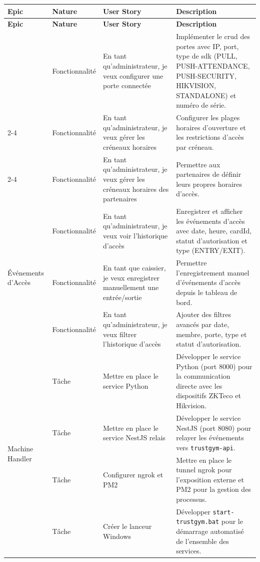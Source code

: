 ﻿\documentclass[../main.tex]{subfiles}
\begin{document}
\begin{longtable}{|p{3cm}|p{2.5cm}|p{4cm}|p{5cm}|}
\hline
\textbf{Epic} & \textbf{Nature} & \textbf{User Story} & \textbf{Description} \\
\hline
\endfirsthead
\hline
\textbf{Epic} & \textbf{Nature} & \textbf{User Story} & \textbf{Description} \\
\hline
\endhead
\hline
\endfoot

\multirow{3}{3cm}{Gestion des Portes} & Fonctionnalit\'{e} & En tant qu'administrateur, je veux configurer une porte connect\'{e}e & Impl\'{e}menter le \acrshort{crud} des portes avec IP, port, type de \acrshort{sdk} (PULL, PUSH-ATTENDANCE, PUSH-SECURITY, HIKVISION, STANDALONE) et num\'{e}ro de s\'{e}rie. \\
\cline{2-4}
& Fonctionnalit\'{e} & En tant qu'administrateur, je veux g\'{e}rer les cr\'{e}neaux horaires & Configurer les plages horaires d'ouverture et les restrictions d'acc\`{e}s par cr\'{e}neau. \\
\cline{2-4}
& Fonctionnalit\'{e} & En tant qu'administrateur, je veux g\'{e}rer les cr\'{e}neaux horaires des partenaires & Permettre aux partenaires de d\'{e}finir leurs propres horaires d'acc\`{e}s. \\
\hline

\multirow{3}{3cm}{\'{E}v\'{e}nements d'Acc\`{e}s} & Fonctionnalit\'{e} & En tant qu'administrateur, je veux voir l'historique d'acc\`{e}s & Enregistrer et afficher les \'{e}v\'{e}nements d'acc\`{e}s avec date, heure, cardId, statut d'autorisation et type (ENTRY/EXIT). \\
\cline{2-4}
& Fonctionnalit\'{e} & En tant que caissier, je veux enregistrer manuellement une entr\'{e}e/sortie & Permettre l'enregistrement manuel d'\'{e}v\'{e}nements d'acc\`{e}s depuis le tableau de bord. \\
\cline{2-4}
& Fonctionnalit\'{e} & En tant qu'administrateur, je veux filtrer l'historique d'acc\`{e}s & Ajouter des filtres avanc\'{e}s par date, membre, porte, type et statut d'autorisation. \\
\hline

\multirow{4}{3cm}{Machine Handler} & T\^{a}che & Mettre en place le service Python & D\'{e}velopper le service Python (port 8000) pour la communication directe avec les dispositifs ZKTeco et Hikvision. \\
\cline{2-4}
& T\^{a}che & Mettre en place le service NestJS relais & D\'{e}velopper le service NestJS (port 8080) pour relayer les \'{e}v\'{e}nements vers \texttt{trustgym-api}. \\
\cline{2-4}
& T\^{a}che & Configurer ngrok et PM2 & Mettre en place le tunnel ngrok \cite{ngrok} pour l'exposition externe et PM2 \cite{pm2} pour la gestion des processus. \\
\cline{2-4}
& T\^{a}che & Cr\'{e}er le lanceur Windows & D\'{e}velopper \texttt{start-trustgym.bat} pour le d\'{e}marrage automatis\'{e} de l'ensemble des services. \\
\hline


\end{longtable}
\end{document}
